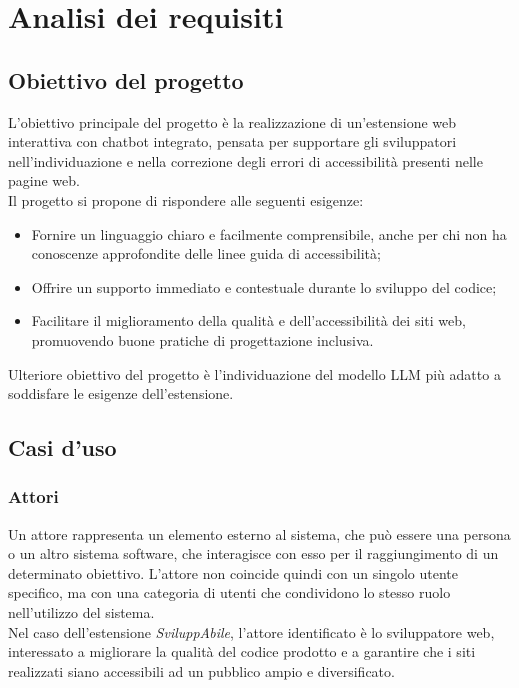 \chapter{Analisi dei requisiti}
\label{chap:analisi-requisiti}

\section{Obiettivo del progetto}
\label{sec:obiettivo}
\noindent L’obiettivo principale del progetto è la realizzazione di un’estensione web interattiva con chatbot integrato, pensata per supportare gli sviluppatori nell’individuazione e nella correzione degli errori di accessibilità presenti nelle pagine web. \\Il progetto si propone di rispondere alle seguenti esigenze:
\begin{itemize}
    \item Fornire un linguaggio chiaro e facilmente comprensibile, anche per chi non ha conoscenze approfondite delle linee guida di accessibilità;
    \item Offrire un supporto immediato e contestuale durante lo sviluppo del codice;
    \item Facilitare il miglioramento della qualità e dell’accessibilità dei siti web, promuovendo buone pratiche di progettazione inclusiva.
\end{itemize}

\noindent Ulteriore obiettivo del progetto è l’individuazione del modello LLM più adatto a soddisfare le esigenze dell’estensione.

\section{Casi d'uso}
\label{sec:uc}

\subsection{Attori}
\noindent Un attore rappresenta un elemento esterno al sistema, che può essere una persona o un altro sistema software, che interagisce con esso per il raggiungimento di un determinato obiettivo. L’attore non coincide quindi con un singolo utente specifico, ma con una categoria di utenti che condividono lo stesso ruolo nell’utilizzo del sistema.\\
Nel caso dell’estensione \textit{SviluppAbile}, l’attore identificato è lo sviluppatore web, interessato a migliorare la qualità del codice prodotto e a garantire che i siti realizzati siano accessibili ad un pubblico ampio e diversificato.

